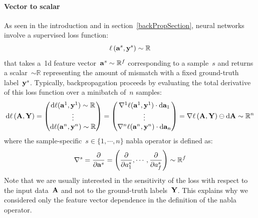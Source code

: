 \documentclass{article}
\begin{document}
\begin{appendices}
\paragraph{Vector to scalar} As seen in the introduction and in section~\ref{backPropSection}, neural networks involve a supervised loss function:
\begin{equation*}
\ell \left( {\bf a}^s , {\bf y}^s \right) \sim \mathbb{R}
\end{equation*}
that takes a~1d feature vector~${\bf a}^s \sim \mathbb{R}^f$ corresponding to a sample~$s$ and returns a scalar~$\sim \mathbb{R}$ representing the amount of mismatch with a fixed ground-truth label~${\bf y}^s$.  Typically, backpropagation proceeds by evaluating the total derivative of this loss function over a minibatch of~$n$ samples: 
\begin{equation}
\text{d} \ell \left( {\bf A} , {\bf Y} \right) = \left( 
\begin{matrix}
    \text{d} \ell ( {\bf a}^1 , {\bf y}^1) \sim \mathbb{R} \\
    \vdots \\
    \text{d} \ell ( {\bf a}^n , {\bf y}^n) \sim \mathbb{R}
\end{matrix}  \right)
 = \left( \begin{matrix}
    \nabla^1 \ell ( {\bf a}^1 , {\bf y}^1) \cdot \text{d} {\bf a}_1 \\
    \vdots \\
    \nabla^n \ell ( {\bf a}^n , {\bf y}^n) \cdot \text{d} {\bf a}_n
\end{matrix}  \right) = \nabla \ell \left( {\bf A} , {\bf Y} \right) \ominus \text{d} {\bf A}  \sim \mathbb{R}^n
\label{totalVectorToScalar}
\end{equation}
\noindent where the sample-specific~$s\in \{1, \cdots ,n \}$ nabla operator is defined as:
\begin{equation*}
\nabla^s = \frac{\partial}{\partial {\bf a}^s} = \left( \frac{\partial}{\partial a^s_1} , \cdots , \frac{\partial}{\partial a^s_f} \right) \sim \mathbb{R}^f 
\end{equation*}
Note that we are usually interested in the sensitivity of the loss with respect to the input data~${\bf A}$ and not to the ground-truth labels~${\bf Y}$.  This explains why we considered only the feature vector dependence in the definition of the nabla operator.


\end{appendices}
\end{document}
